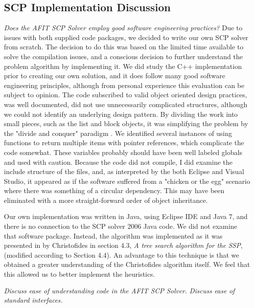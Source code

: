 \documentclass[12pt]{article}
\begin{document}
	\subsection{SCP Implementation Discussion}
	\textit{Does the AFIT SCP Solver employ good software engineering practices?}
	Due to issues with both supplied code packages, we decided to write our own SCP solver from scratch. The decision to do this was based on the limited time available to solve the compilation issues, and a conscious decision to further understand the problem algorithm by implementing it. We did study the C++ implementation prior to creating our own solution, and it does follow many good software engineering principles, although from personal experience this evaluation can be subject to opinion. The code subscribed to valid object oriented design practices, was well documented, did not use unnecessarily complicated structures, although we could not identify an underlying design pattern. By dividing the work into small pieces, such as the list and block objects, it was simplifying the problem by the "divide and conquer" paradigm \cite{software}. We identified several instances of using functions to return multiple items with pointer references, which complicate the code somewhat. These variables probably should have been well labeled globals and used with caution. Because the code did not compile, I did examine the include structure of the files, and, as interpreted by the both Eclipse and Visual Studio, it appeared as if the software suffered from a "chicken or the egg" scenario where there was something of a circular dependency. This may have been eliminated with a more straight-forward order of object inheritance.
	
	Our own implementation was written in Java, using Eclipse IDE and Java 7, and there is no connection to the SCP solver 2006 Java code. We did not examine that software package. Instead, the algorithm was implemented as it was presented in by Christofides in section 4.3, \textit{A tree search algorithm for the SSP}, (modified according to Section 4.4). An advantage to this technique is that we obtained a greater understanding of the Christofides algorithm itself. We feel that this allowed us to better implement the heuristics.
	
	\textit{Discuss ease of understanding code in the AFIT SCP Solver. Discuss ease of standard interfaces.}
	
\end{document}
